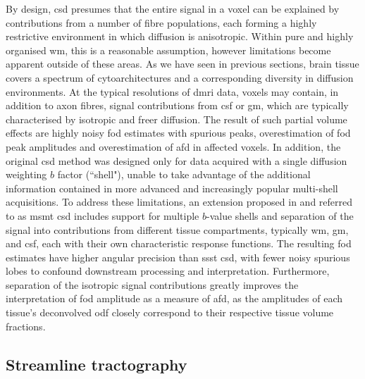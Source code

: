 By design, \gls{csd} presumes that the entire signal in a voxel can be explained by contributions from a number of fibre populations, each forming a highly restrictive environment in which diffusion is anisotropic.
Within pure and highly organised \gls{wm}, this is a reasonable assumption, however limitations become apparent outside of these areas.
As we have seen in previous sections, brain tissue covers a spectrum of cytoarchitectures and a corresponding diversity in diffusion environments.
At the typical resolutions of \gls{dmri} data, voxels may contain, in addition to axon fibres, signal contributions from \gls{csf} or \gls{gm}, which are typically characterised by isotropic and freer diffusion.
The result of such partial volume effects are highly noisy \gls{fod} estimates with spurious peaks, overestimation of \gls{fod} peak amplitudes and overestimation of \gls{afd} in affected voxels.\autocite{Jeurissen2014}
In addition, the original \gls{csd} method was designed only for data acquired with a single diffusion weighting $b$ factor (``shell"), unable to take advantage of the additional information contained in more advanced and increasingly popular multi-shell acquisitions.
To address these limitations, an extension proposed in \textcite{Jeurissen2014} and referred to as \gls{msmt} \gls{csd} includes support for multiple $b$-value shells and separation of the signal into contributions from different tissue compartments, typically \gls{wm}, \gls{gm}, and \gls{csf}, each with their own characteristic response functions.
The resulting \gls{fod} estimates have higher angular precision than \gls{ssst} \gls{csd}, with fewer noisy spurious lobes to confound downstream processing and interpretation.
Furthermore, separation of the isotropic signal contributions greatly improves the interpretation of \gls{fod} amplitude as a measure of \gls{afd}, as the amplitudes of each tissue's deconvolved \gls{odf} closely correspond to their respective tissue volume fractions\autocite{Jeurissen2014}.

\subsection{Streamline tractography}


